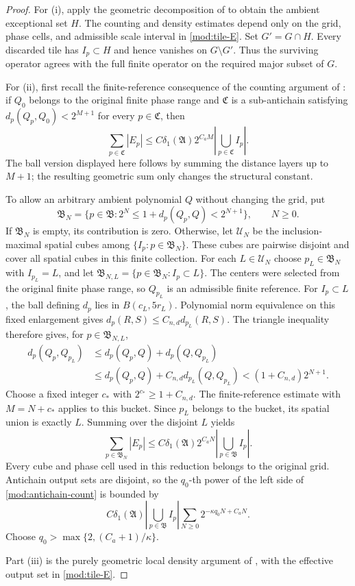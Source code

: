 \documentclass[11pt]{article}
\numberwithin{equation}{section}
\theoremstyle{remark}
\theoremstyle{definition}
\begin{document}
\begin{proof}
For (i), apply the geometric decomposition of
\cite[Proposition~2.4 and Section~4]{BDJST} to obtain the ambient
exceptional set $H$. The counting and density estimates depend only on
the grid, phase cells, and admissible scale interval in
\eqref{mod:tile-E}. Set $G'=G\cap H$. Every discarded tile has
$I_p\subset H$ and hence vanishes on $G\setminus G'$. Thus the
surviving operator agrees with the full finite operator on the required
major subset of $G$.

For (ii), first recall the finite-reference consequence of the counting
argument of \cite[Lemmas~5.6--5.9]{BDJST}: if $Q_0$ belongs to the
original finite phase range and $\mathfrak C$ is a sub-antichain satisfying
$d_p(Q_p,Q_0)<2^{M+1}$ for every $p\in\mathfrak C$, then
\[
 \sum_{p\in\mathfrak C}|E_p|
 \le C\delta_1(\mathfrak A)2^{C_aM}
       \left|\bigcup_{p\in\mathfrak C}I_p\right|.
\]
The ball version displayed here follows by summing the distance layers
up to $M+1$; the resulting geometric sum only changes the structural
constant.

To allow an arbitrary ambient polynomial $Q$ without changing the grid,
put
\[
 \mathfrak B_N=\{p\in\mathfrak B:
          2^N\le1+d_p(Q_p,Q)<2^{N+1}\},\qquad N\ge0.
\]
If $\mathfrak B_N$ is empty, its contribution is zero. Otherwise, let
$\mathcal U_N$ be the inclusion-maximal spatial cubes among
$\{I_p:p\in\mathfrak B_N\}$. These cubes are pairwise disjoint and cover
all spatial cubes in this finite collection. For each $L\in\mathcal U_N$
choose $p_L\in\mathfrak B_N$ with $I_{p_L}=L$, and let
$\mathfrak B_{N,L}=\{p\in\mathfrak B_N:I_p\subset L\}$.
The centers were selected from the original finite phase range, so
$Q_{p_L}$ is an admissible finite reference. For $I_p\subset L$, the ball defining $d_p$ lies in
$B(c_L,5r_L)$. Polynomial norm equivalence on this fixed enlargement
gives $d_p(R,S)\le C_{n,d}d_{p_L}(R,S)$. The triangle inequality
therefore gives, for $p\in\mathfrak B_{N,L}$,
\[
 \begin{split}
 d_p(Q_p,Q_{p_L})
 &\le d_p(Q_p,Q)+d_p(Q,Q_{p_L})\\
 &\le d_p(Q_p,Q)+C_{n,d}d_{p_L}(Q,Q_{p_L})
 <(1+C_{n,d})2^{N+1}.
 \end{split}
\]
Choose a fixed integer $c_*$ with $2^{c_*}\ge1+C_{n,d}$.
The finite-reference estimate with $M=N+c_*$ applies to this bucket. Since $p_L$ belongs to the bucket, its spatial union is exactly
$L$. Summing over the disjoint $L$ yields
\[
 \sum_{p\in\mathfrak B_N}|E_p|
 \le C\delta_1(\mathfrak A)2^{C_aN}
       \left|\bigcup_{p\in\mathfrak B}I_p\right|.
\]
Every cube and phase cell used in this reduction belongs to the
original grid. Antichain output sets are disjoint, so the $q_0$-th power
of the left side of \eqref{mod:antichain-count} is bounded by
\[
 C\delta_1(\mathfrak A)\left|\bigcup_{p\in\mathfrak B}I_p\right|
       \sum_{N\ge0}2^{-\kappa q_0N+C_aN}.
\]
Choose $q_0>\max\{2,(C_a+1)/\kappa\}$.

Part (iii) is the purely geometric local density
argument of \cite[Lemmas 6.8--6.9]{BDJST}, with the effective output set in
\eqref{mod:tile-E}.
\end{proof}
\end{document}

